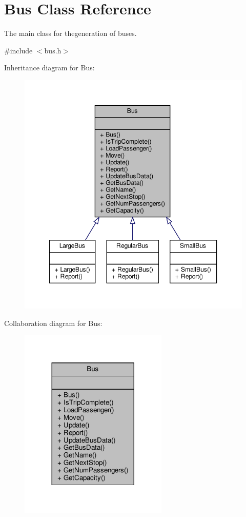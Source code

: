 \hypertarget{classBus}{}\section{Bus Class Reference}
\label{classBus}


The main class for thegeneration of buses.  




{\ttfamily \#include $<$bus.\+h$>$}



Inheritance diagram for Bus\+:\nopagebreak
\begin{figure}[H]
\begin{center}
\leavevmode
\includegraphics[width=347pt]{classBus__inherit__graph}
\end{center}
\end{figure}


Collaboration diagram for Bus\+:\nopagebreak
\begin{figure}[H]
\begin{center}
\leavevmode
\includegraphics[width=200pt]{classBus__coll__graph}
\end{center}
\end{figure}
